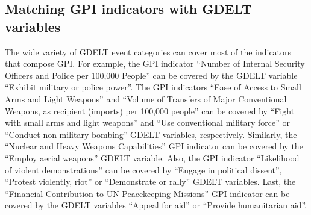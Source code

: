 \documentclass{bmcart}
\begin{document}
\begin{table}[h!]
\centering
\caption{The ten GDELT variables with the largest share of the number of news for the United States over the whole dataset, i.e., from March 2008 to March 2020.}

\end{table}


\subsection{Matching GPI indicators with GDELT variables} 
\label{section:matching}

The wide variety of GDELT event categories can cover most of the indicators that compose GPI. 
For example, the GPI indicator ``Number of Internal Security Officers
and Police per 100,000 People'' can be covered by the GDELT variable ``Exhibit military or police power''. 
The GPI indicators ``Ease of Access to Small Arms and Light Weapons'' and ``Volume of Transfers of Major Conventional Weapons, as recipient (imports) per 100,000 people'' can be covered by ``Fight with small arms and light weapons'' and ``Use conventional military force'' or ``Conduct non-military bombing'' GDELT variables, respectively. 
Similarly, the ``Nuclear and Heavy Weapons Capabilities'' GPI indicator can be covered by the ``Employ aerial weapons'' GDELT variable. 
Also, the GPI indicator ``Likelihood of violent demonstrations'' can be covered by
``Engage in political dissent'', ``Protest violently, riot'' or ``Demonstrate or rally'' GDELT variables. 
Last, the ``Financial Contribution to UN Peacekeeping Missions'' GPI indicator can be covered by the GDELT variables ``Appeal for aid'' or ``Provide humanitarian aid''.
\end{document}
